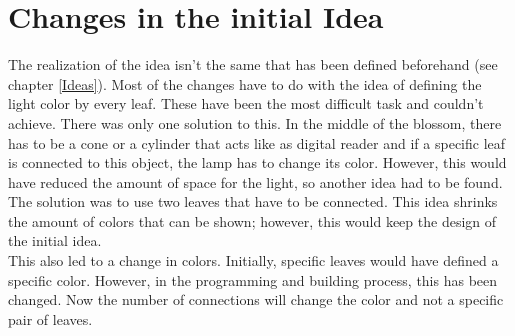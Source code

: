 \documentclass[00_doc.tex]{subfiles}
\begin{document}
    \section{Changes in the initial Idea}
    \begin{flushleft}
        The realization of the idea isn't the same that has been defined beforehand (see chapter 
        \ref{Ideas}). Most of the changes have to do with the idea of defining the light color 
        by every leaf. These have been the most difficult task and couldn't achieve. There was only one 
        solution to this. In the middle of the blossom, there has to be a cone or a cylinder 
        that acts like as digital reader and if a specific leaf is connected to this object, the 
        lamp has to change its color. However, this would have reduced the amount of space for 
        the light, so another idea had to be found. The solution was to use two leaves that 
        have to be connected. This idea shrinks the amount of colors that can be shown; 
        however, this would keep the design of the initial idea. \\

        This also led to a change in colors. Initially, specific leaves would have defined 
        a specific color. However, in the programming and building process, this has been 
        changed. Now the number of connections will change the color and not a specific pair
        of leaves.        
    \end{flushleft}
\end{document}
